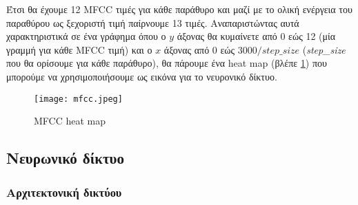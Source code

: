 Έτσι θα έχουμε 12 MFCC τιμές για κάθε παράθυρο και μαζί με το ολική ενέργεια
του παραθύρου ως ξεχοριστή τιμή παίρνουμε 13 τιμές. Αναπαριστώντας αυτά
χαρακτηριστικά σε ένα γράφημα όπου ο $y$ άξονας θα κυμαίνετε από 0 εώς 12 (μία
γραμμή για κάθε MFCC τιμή) και ο $x$ άξονας από 0 εώς $3000 / step\_size$
(\emph{step\_size} που θα ορίσουμε για κάθε παράθυρο), θα πάρουμε ένα heat map
(βλέπε \ref{mfcc}) που μπορούμε να χρησιμοποιήσουμε ως εικόνα για το νευρονικό
δίκτυο.

\begin{figure}[H]
	\center
	\texttt{[image: mfcc.jpeg]}
	\caption{MFCC heat map \cite{fayek2016}}
	\label{mfcc}
\end{figure}

\subsection{Νευρωνικό δίκτυο}
\subsubsection{Αρχιτεκτονική δικτύου}

